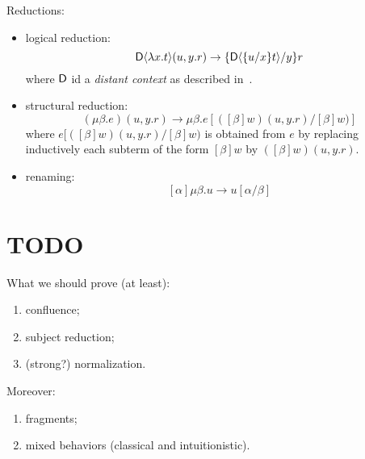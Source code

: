 Reductions:
\begin{itemize}
\item logical reduction:
\[\mathsf{D}\langle \lambda x.t\rangle(u,y.r)\to \{\mathsf{D}\langle\{u/x\}t\rangle/y\}r
\]
where $\mathsf{D}$ id a {\em distant context} as described in~\cite{DBLP:conf/fossacs/SantoKP22}.
\item  structural reduction: 
\[
(\mu\beta. e)(u,y.r) \to\mu\beta.e[([\beta]w)(u,y.r)/[\beta]w)]
\]
where $e[([\beta]w)(u,y.r)/[\beta]w)$ is obtained from $e$ by replacing inductively each subterm of the form $[\beta]w$ by $([\beta]w)(u,y.r)$.
\item renaming:
\[
[\alpha]\mu\beta.u\to u[\alpha/\beta]
\]
\end{itemize}

\section{TODO}
What we should prove (at least):
\begin{enumerate}
\item confluence;
\item subject reduction;
\item (strong?) normalization.
\end{enumerate}

Moreover: 
\begin{enumerate}
\item fragments;
\item mixed behaviors (classical and intuitionistic).
\end{enumerate}
\fi